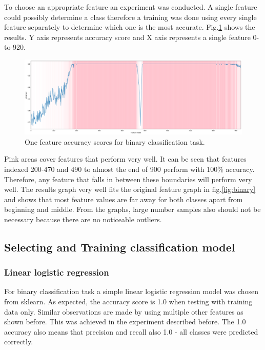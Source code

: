 \documentclass[11pt]{article}
\begin{document}
			To choose an appropriate feature an experiment was conducted. A single feature could possibly determine a class therefore a training was done using every single feature separately to determine which one is the most accurate. Fig.\ref{fig:binary_one} shows the results. Y axis represents accuracy score and X axis represents a single feature 0-to-920. 

			\begin{figure}[H]
				\includegraphics[width=1\textwidth]{png/binary_one}
				\caption{One feature accuracy scores for binary classification task.}
				\label{fig:binary_one}
			\end{figure}
			Pink areas cover features that perform very well. It can be seen that features indexed 200-470 and 490 to almost the end of 900 perform with 100\% accuracy. Therefore, any feature that falls in between these boundaries will perform very well. The results graph very well fits the original feature graph in fig.\ref{fig:binary} and shows that most feature values are far away for both classes apart from beginning and middle. From the graphs, large number samples also should not be necessary because there are no noticeable outliers. 

		\subsection{Selecting and Training classification model}
			\subsubsection{Linear logistic regression}
				For binary classification task a simple linear logistic regression model was chosen from sklearn. As expected, the accuracy score is 1.0 when testing with training data only. Similar observations are made by using multiple other features as shown before. This was achieved in the experiment described before. The 1.0 accuracy also means that precision and recall also 1.0 - all classes were predicted correctly. 
\end{document}
